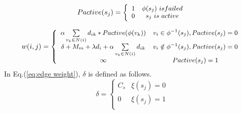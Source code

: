 
\begin{equation}
\footnotesize
Pactive(s_j) = \left\{ {\begin{array}{*{20}{c}}
   { 1 } & {\phi(s_j)\ is failed}  \\
   {0 } & {s_j\ is\ active}  \\
\end{array}} \right.
\label{eq:Vactive}
\end{equation}


\begin{equation}
\footnotesize
w(i,j) = \left\{ {\begin{array}{*{20}{c}}
   { \alpha \sum\limits_{v_k\in N(i)} {{d_{ik}}}*{Pactive(\phi(v_k))} } & {{v_i} \in {\phi ^{ - 1}}({s_j}),Pactive(s_j)=0}  \\
   {\delta+{M_m}+\lambda {d_i}+\alpha \sum\limits_{v_k \in N(i)} {{d_{ik}}}    } & {{v_i} \notin {\phi ^{ - 1}}({s_j}),Pactive(s_j)=0}  \\
   {\infty} & {Pactive(s_j)=1}  \\
\end{array}} \right.
\label{eq:edge weight}
\end{equation}
In Eq.(\ref{eq:edge weight}), $\delta$ is defined as follows.
\begin{equation}
\delta  = \left\{ {\begin{array}{*{20}{c}}
   {{C_s}} & {\xi(s_j) = 0}  \\
   0 & {\xi(s_j) = 1}  \\
\end{array}} \right.
\end{equation}

